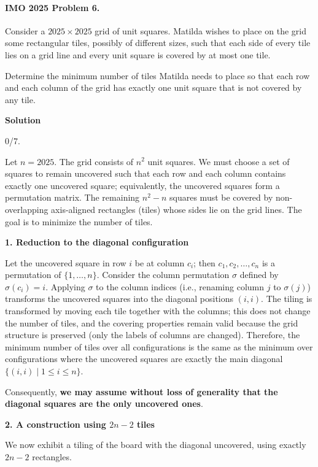 \documentclass{llmxive}
\providecommand{\solutionheading}[1]{\par\smallskip\noindent\textbf{#1}\par}
\begin{document}
\paragraph{IMO 2025 Problem 6.}
\begin{mdframed}[style=mdpurplebox,frametitle={IMO 2025 Problem 6}]
Consider a $2025 \times 2025$ grid of unit squares.
Matilda wishes to place on the grid some rectangular tiles, possibly of different sizes,
such that each side of every tile lies on a grid line
and every unit square is covered by at most one tile.

Determine the minimum number of tiles Matilda needs to place
so that each row and each column of the grid has exactly one unit square
that is not covered by any tile.
\end{mdframed}
\solutionheading{Solution}
\begin{remark*}
  0/7.
\end{remark*}
Let \(n = 2025\). The grid consists of \(n^2\) unit squares. We must choose a set of squares to remain uncovered such that each row and each column contains exactly one uncovered square; equivalently, the uncovered squares form a permutation matrix. The remaining \(n^2 - n\) squares must be covered by non-overlapping axis-aligned rectangles (tiles) whose sides lie on the grid lines. The goal is to minimize the number of tiles.\par
\smallskip
\solutionheading{1. Reduction to the diagonal configuration}
Let the uncovered square in row \(i\) be at column \(c_i\); then \(c_1, c_2, \dots, c_n\) is a permutation of \(\{1,\dots,n\}\). Consider the column permutation \(\sigma\) defined by \(\sigma(c_i) = i\). Applying \(\sigma\) to the column indices (i.e., renaming column \(j\) to \(\sigma(j)\)) transforms the uncovered squares into the diagonal positions \((i,i)\). The tiling is transformed by moving each tile together with the columns; this does not change the number of tiles, and the covering properties remain valid because the grid structure is preserved (only the labels of columns are changed). Therefore, the minimum number of tiles over all configurations is the same as the minimum over configurations where the uncovered squares are exactly the main diagonal \(\{(i,i) \mid 1\le i\le n\}\).\par
Consequently, \textbf{we may assume without loss of generality that the diagonal squares are the only uncovered ones}.\par
\smallskip
\solutionheading{2. A construction using \(2n-2\) tiles}
We now exhibit a tiling of the board with the diagonal uncovered, using exactly \(2n-2\) rectangles.\par
\end{document}
